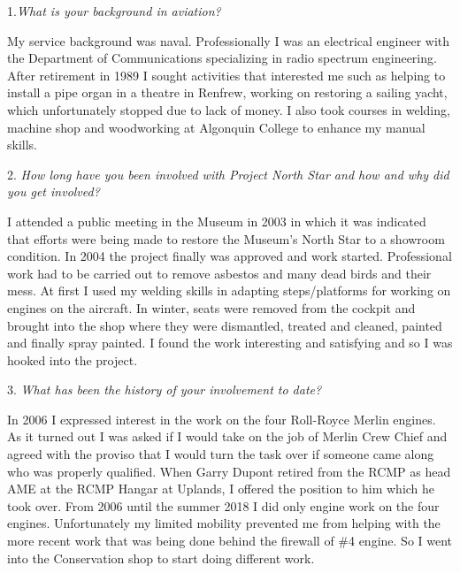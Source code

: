 \begin{multicols}{2}

1.\textit{What is your background in aviation?}

My service background was naval. Professionally I was an electrical engineer
with the Department of Communications specializing in radio spectrum
engineering. After retirement in 1989 I sought activities that interested me
such as helping to install a pipe organ in a theatre in Renfrew, working on
restoring a sailing yacht, which unfortunately stopped due to lack of money. I
also took courses in welding, machine shop and woodworking at Algonquin College
to enhance my manual skills. 

2. \textit{How long have you been involved with Project North Star and how and
why did you get involved?}

I attended a public meeting in the Museum in 2003 in which it was indicated
that efforts were being made to restore the Museum's North Star to a showroom
condition. In 2004 the project finally was approved and work started.
Professional work had to be carried out to remove asbestos and many dead birds
and their mess. At first I used my welding skills in adapting steps/platforms
for working on engines on the aircraft. In winter, seats were removed from the
cockpit and brought into the shop where they were dismantled, treated and
cleaned, painted and finally spray painted. I found the work interesting and
satisfying and so I was hooked into the project.


3. \textit{What has been the history of your involvement to date?}

In 2006 I expressed interest in the work on the four Roll-Royce Merlin engines.
As it turned out I was asked if I would take on the job of Merlin Crew Chief
and agreed with the proviso that I would turn the task over if someone came
along who was properly qualified. When Garry Dupont retired from the RCMP as
head AME at the RCMP Hangar at Uplands, I offered the position to him which he
took over. From 2006 until the summer 2018 I did only engine work on the four
engines. Unfortunately my limited mobility prevented me from helping with the
more recent work that was being done behind the firewall of \#4 engine. So I
went into the Conservation shop to start doing different work.



\end{multicols}
